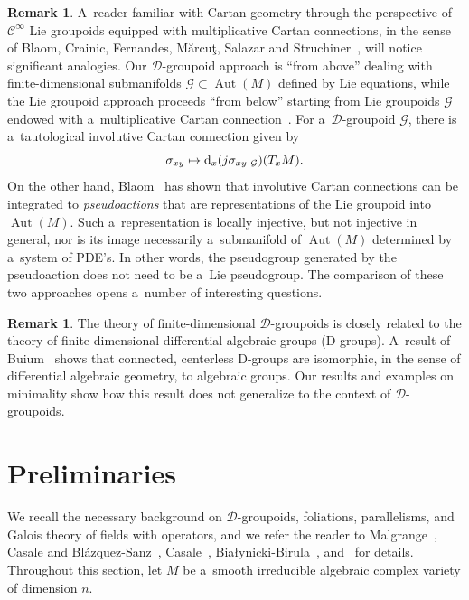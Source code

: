 \documentclass[pdftex]{sigma}
\numberwithin{equation}{section}
\theoremstyle{definition}
\newtheorem{Remark}[Theorem]{Remark}
\begin{document}
\begin{Remark} A~reader familiar with Cartan geometry through the perspective of $\mathscr C^\infty$ Lie groupoids equipped with multiplicative Cartan connections, in the sense of Blaom, Crainic, Fernandes, M{\u{a}}rcu{\c{t}}, Salazar and Struchiner~\cite{blaom2006geometric, Blaom2016, Blaom2016b, crainic2015multiplicative, fernandes2023multiplicative}, will notice significant analogies. Our $\mathcal D$-groupoid approach is ``from above'' dealing with finite-dimensional submanifolds $\mathcal G\subset \operatorname{Aut}(M)$ defined by Lie equations, while the Lie groupoid approach proceeds ``from below'' starting from Lie groupoids $\mathcal G$ endowed with a~multiplicative Cartan connection~\cite[Definition~3.9]{crainic2015multiplicative}. For a~$\mathcal D$-groupoid $\mathcal G$, there is a~tautological involutive Cartan connection given by
\[
\sigma_{xy} \mapsto {\rm d}_x(j\sigma_{xy}|_{\mathcal G})(T_xM).
\]
 On the other hand, Blaom~\cite[Section~2.3]{Blaom2016b} has shown that involutive Cartan connections can be integrated to \emph{pseudoactions} that are representations of the Lie groupoid into $\operatorname{Aut}(M)$. Such a~representation is locally injective, but not injective in general, nor is its image necessarily a~submanifold of $\operatorname{Aut}(M)$ determined by a~system of PDE's. In other words, the pseudogroup generated by the pseudoaction does not need to be a~Lie pseudogroup. The comparison of these two approaches opens a~number of interesting questions.
\end{Remark}

\begin{Remark}
The theory of finite-dimensional $\mathcal D$-groupoids is closely related to the theory of finite-dimensional differential algebraic groups (D-groups). A~result of Buium~\cite[Chapter~5, Theorem 3.6]{buium1992differential} shows that connected, centerless D-groups are isomorphic, in the sense of differential algebraic geometry, to algebraic groups. Our results and examples on minimality show how this result does not generalize to the context of $\mathcal D$-groupoids.
\end{Remark}

\section{Preliminaries}

We recall the necessary background on $\mathcal{D}$-groupoids, foliations, parallelisms, and Galois theory of fields with operators, and we refer the reader to Malgrange~\cite{malgrange2012leon}, Casale and Bl\'azquez-Sanz~\cite{bc2017}, Casale~\cite{Casale2004SurLG}, Bia{\l}ynicki-Birula~\cite{bialynicki1962galois}, and~\cite{Casale_BlazquezSanz_ArenasTirado_2025} for details. Throughout this section, let $M$ be a~smooth irreducible algebraic complex variety of dimension $n$.
\end{document}
